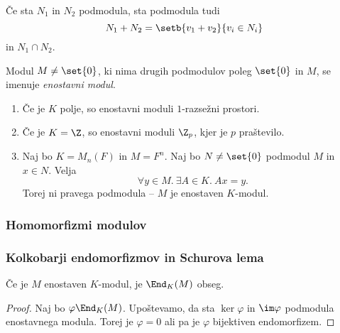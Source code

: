 \begin{trditev}
    Če sta $N_1$ in $N_2$ podmodula, sta podmodula tudi
    \[
        N_1 + N_2 = \setb{v_1 + v_2}{v_i \in N_i}
    \]
    in $N_1 \cap N_2$.
\end{trditev}


\begin{definicija}
    Modul $M \neq \set{0}$, ki nima drugih podmodulov poleg $\set{0}$ in $M$, se imenuje 
    \emph{enostavni modul}.
\end{definicija}

\begin{primer}
    \begin{enumerate}[(1)]
        \item Če je $K$ polje, so enostavni moduli $1$-razsežni prostori.
        \item Če je $K = \Z$, so enostavni moduli $\Z_p$, kjer je $p$ praštevilo.
        \item Naj bo $K = M_n(F)$ in $M = F^n$. Naj bo $N \neq \set{0}$ podmodul $M$ in 
        $x \in N$. Velja
        \[
            \forall y \in M.~\exists A \in K.~Ax = y.
        \]
        Torej ni pravega podmodula -- $M$ je enostaven $K$-modul.
    \end{enumerate}
\end{primer}

\subsubsection*{Homomorfizmi modulov}

%
%

\subsubsection*{Kolkobarji endomorfizmov in Schurova lema}

\begin{lema}[Schur]
    Če je $M$ enostaven $K$-modul, je $\End_K(M)$ obseg.
\end{lema}

\begin{proof}
    Naj bo $\varphi \End_K(M)$. Upoštevamo, da sta $\ker \varphi$ in $\im \varphi$ podmodula 
    enostavnega modula. Torej je $\varphi = 0$ ali pa je $\varphi$ bijektiven endomorfizem.
\end{proof}